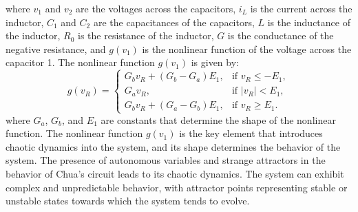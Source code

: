 \documentclass[12pt]{article}
\begin{document}
                where $v_1$ and $v_2$ are the voltages across the capacitors, $i_L$ is the current across the inductor, $C_1$ and $C_2$ are the capacitances of the capacitors, $L$ is the inductance of the inductor, $R_0$ is the resistance of the inductor, $G$ is the conductance of the negative resistance, and $g(v_1)$ is the nonlinear function of the voltage across the capacitor 1. The nonlinear function $g(v_1)$ is given by:
                \[
                g(v_R) = 
                \begin{cases}
                G_bv_R + (G_b - G_a)E_1, & \text{if } v_R \leq -E_1, \\
                G_av_R, & \text{if } \lvert v_R \rvert < E_1, \\
                G_bv_R + (G_a - G_b)E_1, & \text{if } v_R \geq E_1.
                \end{cases}
                \]
                where $G_a$, $G_b$, and $E_1$ are constants that determine the shape of the nonlinear function. The nonlinear function $g(v_1)$ is the key element that introduces chaotic dynamics into the system, and its shape determines the behavior of the system. The presence of autonomous variables and strange attractors in the behavior of Chua's circuit leads to its chaotic dynamics. The system can exhibit complex and unpredictable behavior, with attractor points representing stable or unstable states towards which the system tends to evolve.
\end{document}
